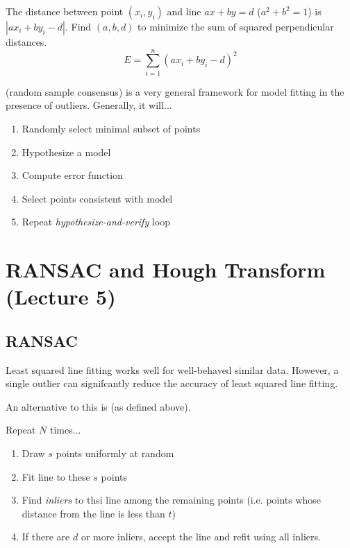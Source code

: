 \documentclass{article}
\begin{document}
\begin{definition}
  The distance between point $(x_i , y_i)$ and line $ax + by = d$ ($a^2 + b^2 = 1$) is $|ax_i + by_i - d|$. Find $(a,b,d)$ to minimize the sum of squared perpendicular distances. $$E = \sum_{i=1}^{n} (ax_i + by_i -d)^{2}$$
\end{definition}

 (random sample consensus) is a very general framework for model fitting in the presence of outliers. Generally, it will$\dots$ 
\begin{enumerate}
  \item Randomly select minimal subset of points 
  \item Hypothesize a model 
  \item Compute error function 
  \item Select points consistent with model 
  \item Repeat \emph{hypothesize-and-verify} loop
\end{enumerate}

\section{RANSAC and Hough Transform (Lecture 5)}

\subsection{RANSAC}

\begin{remark}
  Least squared line fitting works well for well-behaved similar data. However, a single outlier can signifcantly reduce the accuracy of least squared line fitting. 
\end{remark}

An alternative to this is  (as defined above). 

\begin{definition}
  Repeat $N$ times$\dots$
  \begin{enumerate}
    \item Draw $s$ points uniformly at random 
    \item Fit line to these $s$ points 
    \item Find \emph{inliers} to thsi line among the remaining points (i.e. points whose distance from the line is less than $t$)
    \item If there are $d$ or more inliers, accept the line and refit using all inliers. 
  \end{enumerate}
\end{definition}
\end{document}
